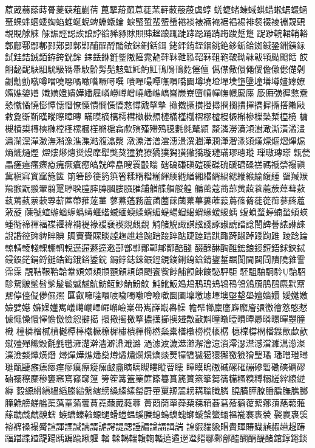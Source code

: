 蒝蒧蒻蒢蒔蓇蓌蒛蒩蒯蒨蓖蒘蒶蓏蒠蓗蓔蓒蓛蒰蒑虡蜳
蜣蜨蝫蝀蜮蜞蜡蜙蜛蝃蜬蝁蜾蝆蜠蜲蜪蜭蜼蜒蜺蜱蜵蝂蜦
蜧蜸蜤蜚蜰蜑裷裧裱裲裺裾裮裼裶裻裰裬裫覝覡覟覞觩觫
觨誫誙誋誒誏誖谽豨豩賕賏賗趖踉踂跿踍跽踊踃踇踆踅跾
踀踄輐輑輎輍鄣鄜鄠鄢鄟鄝鄚鄤鄡鄛酺酲酹酳銥銤鉶銛鉺
銠銔銪銍銦銚銫鉹銗鉿銣鋮銎銂銕銢鉽銈銡銊銆銌銙銧鉾
銇銩銝銋鈭隞隡雿靘靽靺靾鞃鞀鞂靻鞄鞁靿韎韍頖颭颮餂
餀餇馝馜駃馹馻馺駂馽駇骱髣髧鬾鬿魠魡魟鳱鳲鳵麧僿儃
儰僸儆儇僶僾儋儌僽儊劋劌勱勯噈噂噌嘵噁噊噉噆噘噚噀
嘳嘽嘬嘾嘸嘪嘺圚墫墝墱墠墣墯墬墥墡壿嫿嫴嫽嫷嫶嬃嫸
嬂嫹嬁嬇嬅嬏屧嶙嶗嶟嶒嶢嶓嶕嶠嶜嶡嶚嶞幩幝幠幜緳廛
廞廡彉徲憋憃慹憱憰憢憉憛憓憯憭憟憒憪憡憍慦憳戭摮摰
撖撠撅撗撜撏撋撊撌撣撟摨撱撘敶敺敹敻斲斳暵暰暩暲暷
暪暯樀樆樗槥槸樕槱槤樠槿槬槢樛樝槾樧槲槮樔槷槧橀樈
槦槻樍槼槫樉樄樘樥樏槶樦樇槴樖歑殥殣殢殦氁氀毿氂潁
漦潾澇濆澒澍澉澌潢潏澅潚澖潶潬澂潕潲潒潐潗澔澓潝漀
潡潫潽潧澐潓澋潩潿澕潣潷潪潻熲熯熛熰熠熚熩熵熝熥熞
熤熡熪熜熧熳犘犚獘獒獞獟獠獝獛獡獚獙獢璇璉璊璆璁瑽
璅璈瑼瑹甈甇畾瘥瘞瘙瘝瘜瘣瘚瘨瘛皜皝皞皛瞍瞏瞉瞈
磍碻磏磌磑磎磔磈磃磄磉禚禡禠禜禢禛歶稹窲窴窳箷篋
箾箬篎箯箹篊箵糅糈糌糋緷緛緪緧緗緡縃緺緦緶緱緰緮緟
罶羬羰羭翭翫翪翬翦翨聤聧膣膟膞膕膢膙膗舖艏艓艒艐艎
艑蔤蔻蔏蔀蔩蔎蔉蔍蔟蔊蔧蔜蓻蔫蓺蔈蔌蓴蔪蓲蔕蓷蓫蓳
蓼蔒蓪蓩蔖蓾蔨蔝蔮蔂蓽蔞蓶蔱蔦蓧蓨蓰蓯蓹蔘蔠蔰蔋蔙
蔯虢蝖蝣蝤蝷蟡蝳蝘蝔蝛蝒蝡蝚蝑蝞蝭蝪蝐蝎蝟蝝蝯蝬蝺
蝮蝜蝥蝏蝻蝵蝢蝧蝩衚褅褌褔褋褗褘褙褆褖褑褎褉覢覤覣
觭觰觬諏諆誸諓諑諔諕誻諗誾諀諅諘諃誺誽諙谾豍貏賥賟
賙賨賚賝賧趠趜趡趛踠踣踥踤踮踕踛踖踑踙踦踧踔踒踘踓
踜踗踚輬輤輘輚輠輣輖輗遳遰遯遧遫鄯鄫鄩鄪鄲鄦鄮醅醆
醊醁醂醄醀鋐鋃鋄鋀鋙銶鋏鋱鋟鋘鋩鋗鋝鋌鋯鋂鋨鋊鋈鋎
鋦鋍鋕鋉鋠鋞鋧鋑鋓銵鋡錥鋆銴镼閬閫閮閰隤隢雓霅霈霂
靚鞊鞎鞈韐韏頞頝頦頩頨頠頛頧颲餈飺餑餔餖餗餕駜駍駏
駓駔駎駉駖駘駋駗駌骳髬髫髳髲髱魆魃魧魴魱魦魶魵魰
魨魤魬鳼鳺鳽鳿鳷鴇鴀鳹鳻鴈鴅鴄麃黓鼏鼐儜儓儗儚儑凞
匴叡噰噠噮噳噦噣噭噲噞噷圜圛壈墽壉墿墺壂墼壆嬗嬙嬛
嬡嬔嬓嬐嬖嬨嬚嬠嬞寯嶬嶱嶩嶧嶵嶰嶮嶪嶨嶲嶭嶯嶴幧
幨幦幯廩廧廦廨廥彋徼徻憝憨憖懅憴懆懁懌憺憿憸憌擗擖
擐擏擉撽撉擃擛擳擙攳敿敼斢曈暾曀曊曋曏暽暻暺曌朣樴
橦橉橧樲橨樾橝橭橶橛橑樨橚樻樿橁橪橤橐橏橔橯橩橠樼
橞橖橕橍橎橆歕歔歖殧殪殫毈毇氄氃氆澭濋澣濇澼濎濈潞
濄澽澞濊澨瀄澥澮澺澬澪濏澿澸澢濉澫濍澯澲澰燅燂熿熸
燖燀燁燋燔燊燇燏熽燘熼燆燚燛犝犞獩獦獧獬獥獫獪瑿璚
璠璔璒璕璡甋疀瘯瘭瘱瘽瘳瘼瘵瘲瘰皻盦瞚瞝瞡瞜瞛瞢瞣
瞕瞙瞗磝磩磥磪磞磣磛磡磢磭磟磠禤穄穈穇窶窸窵窱窷篞
篣篧篝篕篥篚篨篹篔篪篢篜篫篘篟糒糔糗糐糑縒縡縗縌縟
縠縓縎縜縕縚縢縋縏縖縍縔縥縤罃罻罼罺羱翯耪耩聬膱膦
膮膹膵膫膰膬膴膲膷膧臲艕艖艗蕖蕅蕫蕍蕓蕡蕘蕀蕆蕤蕁
蕢蕄蕑蕇蕣蔾蕛蕱蕎蕮蕵蕕蕧蕠薌蕦蕝蕔蕥蕬虣虥虤螤螛
螏螗螓螒螈螁螖螘蝹螇螣螅螐螑螝螄螔螜螚螉褞褦褰褭褮
褧褱褢褩褣褯褬褟觱諠諢諲諴諵諝謔諤諟諰諈諞諡諨諿諯
諻貑貒貐賵賮賱賰賳赬赮趥趧踳踾踸蹀蹅踶踼踽蹁踰踿躽
輶輮輵輲輹輷輴遶遹遻邆郺鄳鄵鄶醓醐醑醍醏錧錞錈錟
